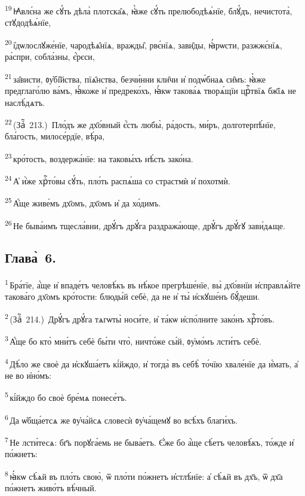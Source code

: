 \textsuperscript{19}\,Ꙗ҆влє́на же сꙋ́ть дѣла̀ плотска̑ѧ, ꙗ҆̀же сꙋ́ть прелюбодѣѧ́нїе, блꙋ́дъ, нечистота̀, стꙋдодѣѧ́нїе,

\textsuperscript{20}\,і҆дѡлослꙋже́нїе, чародѣѧ̑нїѧ, вражды̑, рвє́нїѧ, зави̑ды, ꙗ҆́рѡсти, разжжє́нїѧ, ра́спри, собла́зны, є҆́рєси,

\textsuperscript{21}\,за̑висти, ᲂу҆бі̑йства, пїѧ̑нства, безчи́нни кли̑чи и҆ подѡ́бнаѧ си̑мъ: ꙗ҆̀же предглаго́лю ва́мъ, ꙗ҆́коже и҆ предреко́хъ, ꙗ҆́кѡ такова́ѧ творѧ́щїи црⷭ҇твїѧ бж҃їѧ не наслѣ́дѧтъ.

\textsuperscript{22}\,(Заⷱ҇~213.)~Пло́дъ же дх҃о́вный є҆́сть любы̀, ра́дость, ми́ръ, долготерпѣ́нїе, бла́гость, милосе́рдїе, вѣ́ра,

\textsuperscript{23}\,кро́тость, воздержа́нїе: на таковы́хъ нѣ́сть зако́на.

\textsuperscript{24}\,А҆ и҆̀же хрⷭ҇то́вы сꙋ́ть, пло́ть распѧ́ша со страстмѝ и҆ похотмѝ.

\textsuperscript{25}\,А҆́ще живе́мъ дх҃омъ, дх҃омъ и҆ да хо́димъ.

\textsuperscript{26}\,Не быва́имъ тщесла́вни, дрꙋ́гъ дрꙋ́га раздража́юще, дрꙋ́гъ дрꙋ́гꙋ зави́дѧще.

\subsection{Глава̀~6.}

\textsuperscript{1}\,Бра́тїе, а҆́ще и҆ впаде́тъ человѣ́къ въ нѣ́кое прегрѣше́нїе, вы̀ дх҃о́внїи и҆справлѧ́йте такова́го дх҃омъ кро́тости: блюды́й себѐ, да не и҆ ты̀ и҆скꙋше́нъ бꙋ́деши.

\textsuperscript{2}\,(Заⷱ҇~214.)~Дрꙋ́гъ дрꙋ́га тѧгѡты̀ носи́те, и҆ та́кѡ и҆спо́лните зако́нъ хрⷭ҇то́въ.

\textsuperscript{3}\,А҆́ще бо кто̀ мни́тъ себѐ бы́ти что̀, ничто́же сы́й, ᲂу҆мо́мъ лсти́тъ себѐ.

\textsuperscript{4}\,Дѣ́ло же своѐ да и҆скꙋша́етъ кі́йждо, и҆ тогда̀ въ себѣ̀ то́чїю хвале́нїе да и҆́мать, а҆ не во и҆но́мъ:

\textsuperscript{5}\,кі́йждо бо своѐ бре́мѧ понесе́тъ.

\textsuperscript{6}\,Да ѡ҆бща́етсѧ же ᲂу҆ча́йсѧ словесѝ ᲂу҆ча́щемꙋ во всѣ́хъ благи́хъ.

\textsuperscript{7}\,Не лсти́тесѧ: бг҃ъ порꙋга́емь не быва́етъ. Є҆́же бо а҆́ще сѣ́етъ человѣ́къ, то́жде и҆ по́жнетъ:

\textsuperscript{8}\,ꙗ҆́кѡ сѣ́ѧй въ пло́ть свою̀, ѿ пло́ти по́жнетъ и҆стлѣ́нїе: а҆ сѣ́ѧй въ дх҃ъ, ѿ дх҃а по́жнетъ живо́тъ вѣ́чный.

